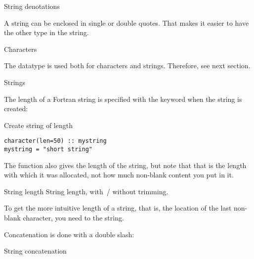 
 {String denotations}

A string can be enclosed in single or double quotes. That makes it
easier to have the other type in the string.


 {Characters}

The datatype  is used
both for characters and strings.
Therefore, see next section.

 {Strings}
\label{sec:f-string-ops}

The length of a Fortran string is specified with the
 keyword when the string is created:

\begin{block}{Create string of length}
  \label{sl:f-char-string}
\begin{lstlisting}
character(len=50) :: mystring
mystring = "short string"
\end{lstlisting}
\end{block}

The  function also gives the length of the string,
but note that that is the length with which
it was allocated, not how much non-blank content you put in it.

\begin{block}{String length}
  \label{sl:f-string-length}
  String length, with~/ without trimming.
\end{block}

To get the more intuitive length of a string, that is, the location of
the last non-blank character, you need to  the string.


Concatenation is done with a double slash:
\begin{block}{String concatenation}
  \label{sl:f-string-concat}
\end{block}

